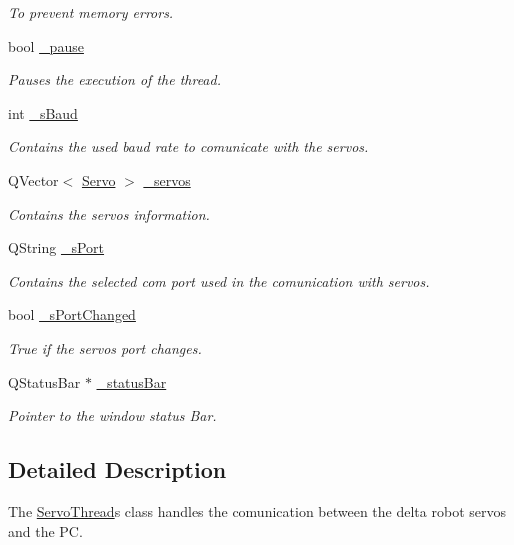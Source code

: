 \begin{DoxyCompactItemize}
\begin{DoxyCompactList}\small\item\em To prevent memory errors. \end{DoxyCompactList}\item 
bool \hyperlink{class_servo_thread_aaf2ef80e8e43518b75d20a5102970d2e}{\+\_\+pause}
\begin{DoxyCompactList}\small\item\em Pauses the execution of the thread. \end{DoxyCompactList}\item 
int \hyperlink{class_servo_thread_a5b9a41b9e271275b914affb0a845a2ee}{\+\_\+s\+Baud}
\begin{DoxyCompactList}\small\item\em Contains the used baud rate to comunicate with the servos. \end{DoxyCompactList}\item 
Q\+Vector$<$ \hyperlink{struct_servo_thread_1_1_servo}{Servo} $>$ \hyperlink{class_servo_thread_a1ac6662fe6d198b5971ae0ffa7ddfcfd}{\+\_\+servos}
\begin{DoxyCompactList}\small\item\em Contains the servos information. \end{DoxyCompactList}\item 
Q\+String \hyperlink{class_servo_thread_ac9a614aa1518efb49b0a06636bd1bdbf}{\+\_\+s\+Port}
\begin{DoxyCompactList}\small\item\em Contains the selected com port used in the comunication with servos. \end{DoxyCompactList}\item 
bool \hyperlink{class_servo_thread_a6e803432db01b10ed975132315280fd3}{\+\_\+s\+Port\+Changed}
\begin{DoxyCompactList}\small\item\em True if the servos port changes. \end{DoxyCompactList}\item 
Q\+Status\+Bar $\ast$ \hyperlink{class_servo_thread_ab03428f82ff9343dbbca155a91908c0a}{\+\_\+status\+Bar}
\begin{DoxyCompactList}\small\item\em Pointer to the window status Bar. \end{DoxyCompactList}\end{DoxyCompactItemize}


\subsection{Detailed Description}
The \hyperlink{class_servo_thread}{Servo\+Thread}\textquotesingle{}s class handles the comunication between the delta robot servos and the P\+C. 




